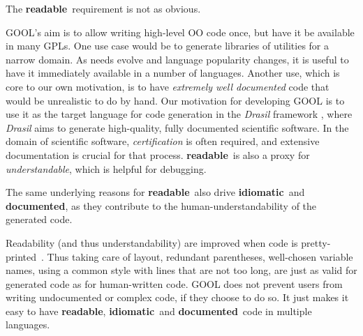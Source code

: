 \documentclass[sigplan,review,prologue,dvipsnames]{acmart}
\newcommand{\Cplusplus}{C\texttt{++}}
\newcommand{\abbrev}[1]{\textbf{#1}}
\newcommand{\readable}{\abbrev{readable}}
\newcommand{\idiomatic}{\abbrev{idiomatic}}
\newcommand{\documented}{\abbrev{documented}}
\begin{document}
The \readable~requirement is not as obvious. 

GOOL's aim is to allow writing
high-level OO code once, but have it be available in many GPLs. One use case
would be to generate libraries of utilities for a narrow domain. As needs
evolve and language popularity changes, it is useful to have it immediately
available in a number of languages. Another use, which is core to our
own motivation, is to have \emph{extremely well documented} code that would be 
unrealistic to do by hand. Our motivation for developing GOOL is to use it as 
the target language for code generation in the \textit{Drasil} framework 
\cite{SzymczakEtAl2016, Drasil2019}, where 
\textit{Drasil} aims to generate high-quality, fully documented scientific 
software. In the domain of scientific software, \emph{certification} is often 
required, and extensive documentation is crucial for that process. \readable~is 
also a proxy for \emph{understandable}, which is helpful for debugging.

The same underlying reasons for \readable~also drive \idiomatic~and \documented,
as they contribute to the human-understandability of the generated code.

Readability (and thus understandability) are improved when code is 
pretty-printed~\cite{buse2009learning}. Thus taking care of layout, redundant parentheses,
well-chosen variable names, using a common style with lines that are not too
long, are just as valid for generated code as for human-written code.
GOOL does not prevent users from writing undocumented or complex code, if they
choose to do so. It just makes it easy to have \readable, \idiomatic~and
\documented~code in multiple languages.
\end{document}

